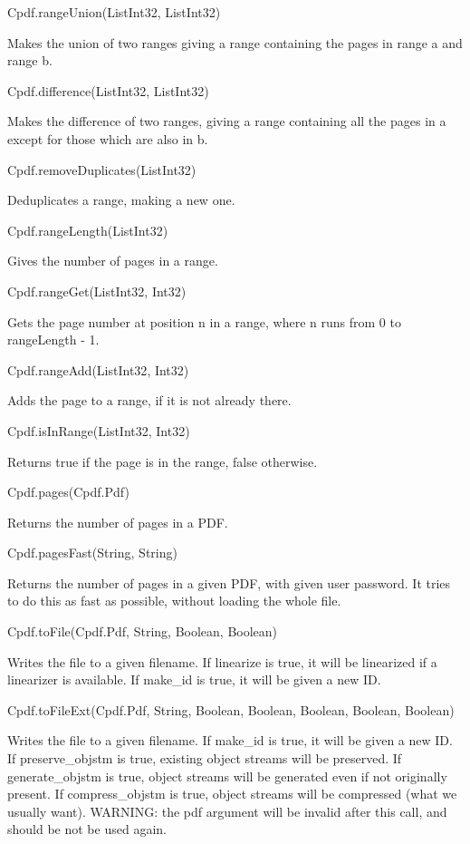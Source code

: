 Cpdf.rangeUnion(List{Int32}, List{Int32})


Makes the union of two ranges giving a range
containing the pages in range a and range b.


Cpdf.difference(List{Int32}, List{Int32})


Makes the difference of two ranges, giving a range
containing all the pages in a except for those which are also in b.


Cpdf.removeDuplicates(List{Int32})


Deduplicates a range, making a new one.


Cpdf.rangeLength(List{Int32})


Gives the number of pages in a range.


Cpdf.rangeGet(List{Int32}, Int32)


Gets the page number at position n in a range, 
where n runs from 0 to rangeLength - 1.


Cpdf.rangeAdd(List{Int32}, Int32)


Adds the page to a range, if it is not already
there.


Cpdf.isInRange(List{Int32}, Int32)


Returns true if the page is in the range, 
false otherwise.


Cpdf.pages(Cpdf.Pdf)


Returns the number of pages in a PDF.


Cpdf.pagesFast(String, String)


Returns the number of pages in a given
PDF, with given user password. It tries to do this as fast as
possible, without loading the whole file.


Cpdf.toFile(Cpdf.Pdf, String, Boolean, Boolean)


Writes the file to a given
filename. If linearize is true, it will be linearized if a linearizer is
available. If make_id is true, it will be given a new ID.


Cpdf.toFileExt(Cpdf.Pdf, String, Boolean, Boolean, Boolean, Boolean, Boolean)


Writes the file to a given filename. If
make_id is true, it will be given a new ID.  If preserve_objstm is true, 
existing object streams will be preserved. If generate_objstm is true, 
object streams will be generated even if not originally present. If
compress_objstm is true, object streams will be compressed (what we
usually want). WARNING: the pdf argument will be invalid after this call, 
and should be not be used again.


